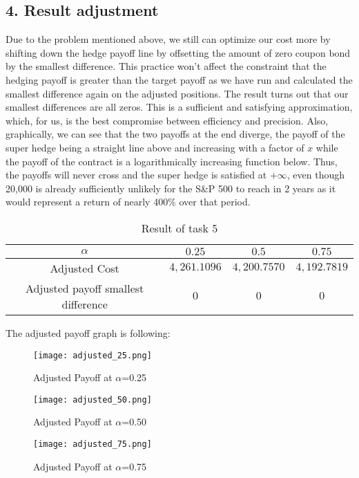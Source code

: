 \subsection*{4. Result adjustment}
Due to the problem mentioned above, we still can optimize our cost more by shifting down the hedge payoff line by offsetting the amount of zero coupon bond by the smallest difference. This practice won't affect the constraint that the hedging payoff is greater than the target payoff as we have run and calculated the smallest difference again on the adjusted positions. The result turns out that our smallest differences are all zeros. This is a sufficient and satisfying approximation, which, for us, is the best compromise between efficiency and precision. Also, graphically, we can see that the two payoffs at the end diverge, the payoff of the super hedge being a straight line above and increasing with a factor of $x$ while the payoff of the contract is a logarithmically increasing function below. Thus, the payoffs will never cross and the super hedge is satisfied at $+\infty$, even though 20,000 is already sufficiently unlikely for the S\&P 500 to reach in 2 years as it would represent a return of nearly 400$\%$ over that period.

\begin{table}[H]
    \centering
    \begin{tabular}{|c|c|c|c|}
        \hline
        $\alpha$& $0.25$ & $0.5$ & $0.75$ \\
        \hline
        Adjusted Cost & $4,261.1096$& $4,200.7570$& $4,192.7819$\\
        \hline
        Adjusted payoff smallest difference & $0$ & $0$ & $0$\\
        \hline
    \end{tabular}
    \caption{Result of task 5}
    \label{tab:adjusted_task_5_result}
\end{table}
The adjusted payoff graph is following:
\begin{figure}[H]
    \centering
    \texttt{[image: adjusted\_25.png]}
    \caption{Adjusted Payoff at $\alpha$=0.25}
    \label{tab:Adjusted Payoff at 0.25}
\end{figure}
\begin{figure}[H]
    \centering
    \texttt{[image: adjusted\_50.png]}
    \caption{Adjusted Payoff at $\alpha$=0.50}
    \label{tab:Adjusted Payoff at 0.50}
\end{figure}
\begin{figure}[H]
    \centering
    \texttt{[image: adjusted\_75.png]}
    \caption{Adjusted Payoff at $\alpha$=0.75}
    \label{tab:Adjusted Payoff at 0.75}
\end{figure}

